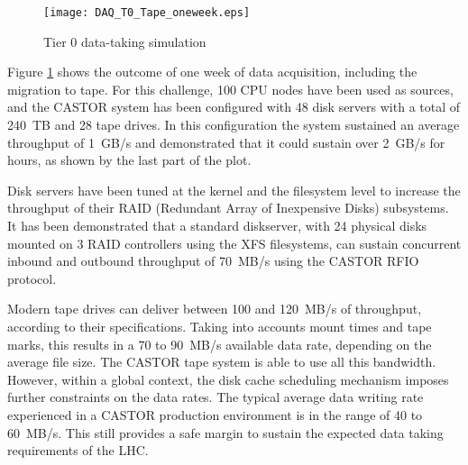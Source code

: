 \begin{figure}[htbp]
\centering
\texttt{[image: DAQ\_T0\_Tape\_oneweek.eps]}
\caption{Tier 0 data-taking simulation}
\label{fig:itdc1}
\end{figure}

Figure \ref{fig:itdc1} shows the outcome of one week of data acquisition,
including the migration to tape. For this challenge, 100 CPU
nodes have been used as sources, and the CASTOR system has been configured with
48 disk servers with a total of 240~TB and 28 tape drives.
In this configuration the system sustained an average
throughput of 1~GB/s and demonstrated that it could sustain over 2~GB/s for
hours, as shown by the last part of the plot.

Disk servers have been tuned at the kernel and the filesystem level to increase
the throughput of their RAID (Redundant Array of Inexpensive Disks) subsystems.
It has been demonstrated that a standard diskserver, with 24 physical disks
mounted on 3 RAID controllers using the XFS filesystems, can sustain concurrent
inbound and outbound throughput of 70~MB/s using the CASTOR RFIO protocol.

Modern tape drives can deliver between 100 and 120~MB/s of throughput, according to their specifications.
Taking into accounts mount times and tape marks, this results in a 70 to 90~MB/s available data rate,
depending on the average file size.
The CASTOR tape system is able to use all this bandwidth.
However, within a global context, the disk cache scheduling mechanism imposes further constraints on 
the data rates. The typical average data writing rate experienced in a CASTOR production environment
is in the range of 40 to 60~MB/s. This still provides a safe margin to sustain the expected 
data taking requirements of the LHC.

